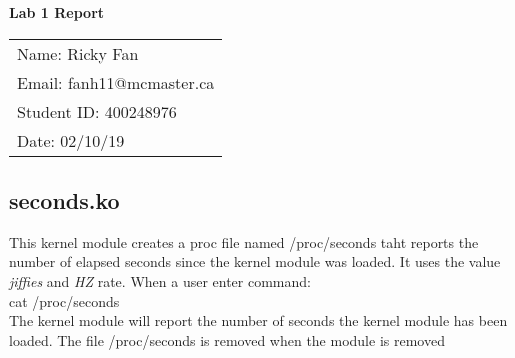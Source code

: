 \documentclass[11pt,fleqn]{article}
\begin{document}
\begin{center}
	{\Large \textbf{Lab 1 Report}}\\[6mm]
	\begin{tabular}{l}
        {\large Name: Ricky Fan}       \\
		{\large Email: fanh11@mcmaster.ca} \\
		{\large Student ID: 400248976}    \\
		{\large Date: 02/10/19}
	\end{tabular}

\end{center}

\medskip

\subsection*{seconds.ko}
This kernel module creates a proc file named /proc/seconds 
taht reports the number of elapsed seconds since the kernel 
module was loaded. It uses the value \emph{jiffies} and \emph{HZ} 
rate. When a user enter command: \\

cat /proc/seconds \\

\noindent 
The kernel module will report the number of seconds the kernel 
module has been loaded. The file /proc/seconds is removed 
when the module is removed

\end{document}
